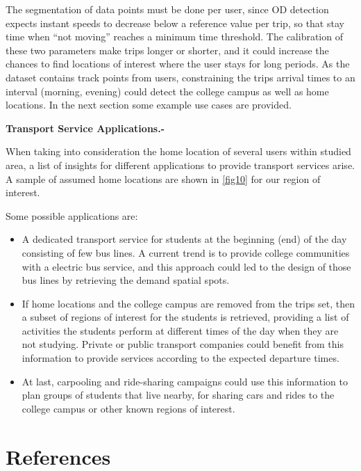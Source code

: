 \documentclass[runningheads]{llncs}
\begin{document}
The segmentation of data points must be done per user, since OD detection expects instant speeds to decrease below a reference value per trip, so that stay time when ``not moving'' reaches a minimum time threshold. The calibration of these two parameters make trips longer or shorter, and it could increase the chances to find locations of interest where the user stays for long periods. As the dataset contains track points from users, constraining the trips arrival times to an interval (morning, evening) could detect the college campus as well as home locations. In the next section some example use cases are provided.

\textbf{Transport Service Applications.-}

When taking into consideration the home location of several users within studied area, a list of insights for different applications to provide transport services arise. A sample of assumed home locations are shown in \ref{fig10} for our region of interest.

Some possible applications are:

\begin{itemize}
\item
  A dedicated transport service for students at the beginning (end) of the day consisting of few bus lines. A current trend is to provide college communities with a electric bus service, and this approach could led to the design of those bus lines by retrieving the demand spatial spots.
\item
  If home locations and the college campus are removed from the trips set, then a subset of regions of interest for the students is retrieved, providing a list of activities the students perform at different times of the day when they are not studying. Private or public transport companies could benefit from this information to provide services according to the expected departure times.
\item
  At last, carpooling and ride-sharing campaigns could use this information to plan groups of students that live nearby, for sharing cars and rides to the college campus or other known regions of interest.
\end{itemize}

\hypertarget{references}{%
\section*{References}\label{references}}
\end{document}
